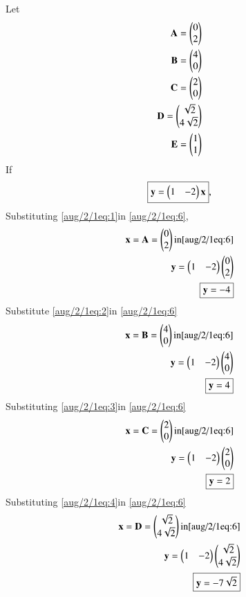   

Let 
\begin{align}
\mathbf{A}=\begin{pmatrix}0\\2\end{pmatrix}\label{aug/2/1eq:1} \\
\mathbf{B}=\begin{pmatrix}4\\0\end{pmatrix}\label{aug/2/1eq:2} \\
\mathbf{C}=\begin{pmatrix}2\\0\end{pmatrix} \label{aug/2/1eq:3}\\
\mathbf{D}=\begin{pmatrix}\sqrt{2}\\4\sqrt{2}\end{pmatrix}\label{aug/2/1eq:4} \\
\mathbf{E}=\begin{pmatrix}1\\1\end{pmatrix}\label{aug/2/1eq:5}
\end{align}
If
\begin{equation} \label{aug/2/1eq:6}
\boxed{\mathbf{y}=\begin{pmatrix}1&-2\end{pmatrix}\mathbf{x}},
\end{equation}
Substituting \eqref{aug/2/1eq:1}in \eqref{aug/2/1eq:6},
\begin{align}
 \mathbf{x}=\mathbf{A}=\begin{pmatrix}0\\2\end{pmatrix}\text{in} \eqref{aug/2/1eq:6}\\
          \mathbf{y}=\begin{pmatrix}1&-2\end{pmatrix}\begin{pmatrix}0\\2\end{pmatrix}\\
          \boxed{\mathbf{y}=-4}
\end{align}
Substitute \eqref{aug/2/1eq:2}in \eqref{aug/2/1eq:6}
\begin{align}
\mathbf{x}=\mathbf{B}=\begin{pmatrix}4\\0\end{pmatrix}\text{in} \eqref{aug/2/1eq:6}\\
          \mathbf{y}=\begin{pmatrix}1&-2\end{pmatrix}\begin{pmatrix}4\\0\end{pmatrix}\\
          \boxed{\mathbf{y}=4}
\end{align}
Substituting \eqref{aug/2/1eq:3}in \eqref{aug/2/1eq:6}
\begin{align}
 \mathbf{x}=\mathbf{C}=\begin{pmatrix}2\\0\end{pmatrix}\text{in} \eqref{aug/2/1eq:6}\\
          \mathbf{y}=\begin{pmatrix}1&-2\end{pmatrix}\begin{pmatrix}2\\0\end{pmatrix}\\
          \boxed{\mathbf{y}=2}   
\end{align}
Substituting \eqref{aug/2/1eq:4}in \eqref{aug/2/1eq:6}
\begin{align}
\mathbf{x}=\mathbf{D}=\begin{pmatrix}\sqrt{2}\\4\sqrt{2}\end{pmatrix}\text{in} \eqref{aug/2/1eq:6}\\
          \mathbf{y}=\begin{pmatrix}1&-2\end{pmatrix}\begin{pmatrix}\sqrt{2}\\4\sqrt{2}\end{pmatrix}\\
          \boxed{\mathbf{y}=-7\sqrt{2}}    
\end{align}
